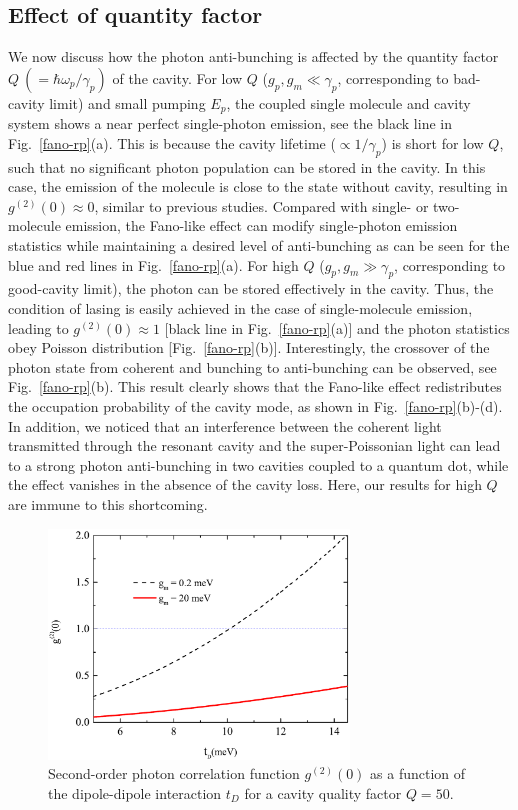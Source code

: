 \documentclass[aps,prb,
,floatfix,footinbib,longbibliography,
preprint
]{revtex4-2}
\begin{document}
\subsection{Effect of quantity factor}
We now discuss how the photon anti-bunching is affected by the quantity factor $Q~(=\hbar\omega_{p}/\gamma_{p})$ of the cavity.
For low $Q$ ($g_{p},g_{m}\ll \gamma_{p}$, corresponding to bad-cavity limit) and small pumping $E_{p}$, the coupled single molecule and cavity system shows a near perfect single-photon emission, see the black line in Fig.~\ref{fano-rp}(a).
This is because the cavity lifetime ($\propto 1/\gamma_{p}$) is short for low $Q$, such that no significant photon population can be stored in the cavity.
In this case, the emission of the molecule is close to the state without cavity, resulting in $g^{(2)}(0)\approx0$, similar to previous studies\cite{PhysRevB.70.115304,PhysRevA.91.061804}.
Compared with single- or two-molecule emission, the Fano-like effect can modify single-photon emission statistics while maintaining
a desired level of anti-bunching as can be seen for the blue and red lines in Fig.~\ref{fano-rp}(a).
For high $Q$ ($g_{p},g_{m}\gg \gamma_{p}$, corresponding to good-cavity limit), the photon can be stored effectively in the cavity. Thus, the condition of lasing is easily achieved in the case of single-molecule emission, leading to $g^{(2)}(0)\approx 1$ [black line in Fig.~\ref{fano-rp}(a)] and the photon statistics obey Poisson distribution [Fig.~\ref{fano-rp}(b)].
Interestingly, the crossover of the photon state from coherent and bunching to anti-bunching can be observed, see Fig.~\ref{fano-rp}(b).
This result clearly shows that the Fano-like effect redistributes the occupation probability of the cavity mode, as shown in Fig.~\ref{fano-rp}(b)-(d).
 In addition, we noticed that an interference between the coherent light transmitted through the resonant cavity and the super-Poissonian light can lead to a strong photon anti-bunching in two cavities coupled to a quantum dot, while the effect vanishes in the absence of the cavity loss\cite{PhysRevLett.108.183601}. Here, our results for high $Q$ are immune to this shortcoming.

\begin{figure}[h]
\centering
\includegraphics[width=8cm]{fano-td.pdf}
\caption{Second-order photon correlation function $g^{(2)}(0)$ as a function of the dipole-dipole interaction $t_{D}$ for a cavity quality factor $Q=50$.}
\label{fano-td}
\end{figure}
\end{document}

